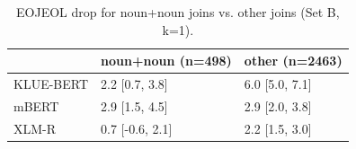 \begin{table}
\caption{EOJEOL drop for noun+noun joins vs. other joins (Set B, k=1).}
\label{tab:table8_eojeol_nounnoun}
\begin{tabular}{lll}
\toprule
 & noun+noun (n=498) & other (n=2463) \\
\midrule
KLUE-BERT & 2.2 [0.7, 3.8] & 6.0 [5.0, 7.1] \\
mBERT & 2.9 [1.5, 4.5] & 2.9 [2.0, 3.8] \\
XLM-R & 0.7 [-0.6, 2.1] & 2.2 [1.5, 3.0] \\
\bottomrule
\end{tabular}
\end{table}
